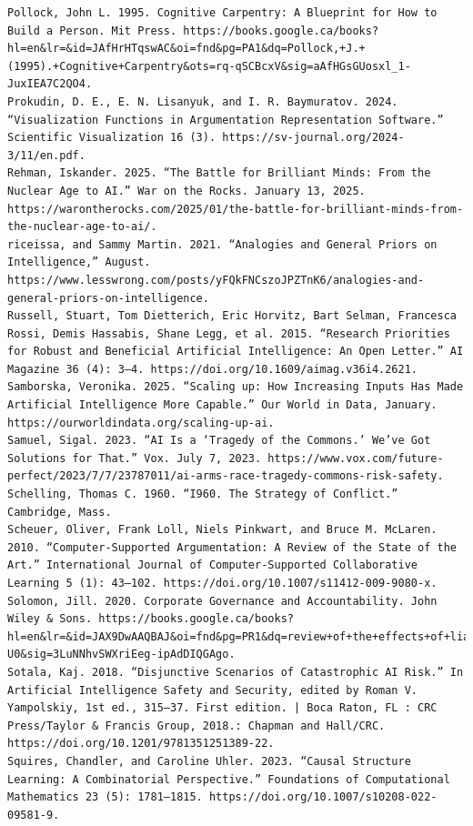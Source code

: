 \documentclass[
  11pt,
  letterpaper,
]{book}
\begin{document}
\begin{verbatim}
Pollock, John L. 1995. Cognitive Carpentry: A Blueprint for How to Build a Person. Mit Press. https://books.google.ca/books?hl=en&lr=&id=JAfHrHTqswAC&oi=fnd&pg=PA1&dq=Pollock,+J.+(1995).+Cognitive+Carpentry&ots=rq-qSCBcxV&sig=aAfHGsGUosxl_1-JuxIEA7C2QO4.
Prokudin, D. E., E. N. Lisanyuk, and I. R. Baymuratov. 2024. “Visualization Functions in Argumentation Representation Software.” Scientific Visualization 16 (3). https://sv-journal.org/2024-3/11/en.pdf.
Rehman, Iskander. 2025. “The Battle for Brilliant Minds: From the Nuclear Age to AI.” War on the Rocks. January 13, 2025. https://warontherocks.com/2025/01/the-battle-for-brilliant-minds-from-the-nuclear-age-to-ai/.
riceissa, and Sammy Martin. 2021. “Analogies and General Priors on Intelligence,” August. https://www.lesswrong.com/posts/yFQkFNCszoJPZTnK6/analogies-and-general-priors-on-intelligence.
Russell, Stuart, Tom Dietterich, Eric Horvitz, Bart Selman, Francesca Rossi, Demis Hassabis, Shane Legg, et al. 2015. “Research Priorities for Robust and Beneficial Artificial Intelligence: An Open Letter.” AI Magazine 36 (4): 3–4. https://doi.org/10.1609/aimag.v36i4.2621.
Samborska, Veronika. 2025. “Scaling up: How Increasing Inputs Has Made Artificial Intelligence More Capable.” Our World in Data, January. https://ourworldindata.org/scaling-up-ai.
Samuel, Sigal. 2023. “AI Is a ‘Tragedy of the Commons.’ We’ve Got Solutions for That.” Vox. July 7, 2023. https://www.vox.com/future-perfect/2023/7/7/23787011/ai-arms-race-tragedy-commons-risk-safety.
Schelling, Thomas C. 1960. “I960. The Strategy of Conflict.” Cambridge, Mass.
Scheuer, Oliver, Frank Loll, Niels Pinkwart, and Bruce M. McLaren. 2010. “Computer-Supported Argumentation: A Review of the State of the Art.” International Journal of Computer-Supported Collaborative Learning 5 (1): 43–102. https://doi.org/10.1007/s11412-009-9080-x.
Solomon, Jill. 2020. Corporate Governance and Accountability. John Wiley & Sons. https://books.google.ca/books?hl=en&lr=&id=JAX9DwAAQBAJ&oi=fnd&pg=PR1&dq=review+of+the+effects+of+liability+frameworks+on+corporate+governance+&ots=ny23_vd-U0&sig=3LuNNhvSWXriEeg-ipAdDIQGAgo.
Sotala, Kaj. 2018. “Disjunctive Scenarios of Catastrophic AI Risk.” In Artificial Intelligence Safety and Security, edited by Roman V. Yampolskiy, 1st ed., 315–37. First edition. | Boca Raton, FL : CRC Press/Taylor & Francis Group, 2018.: Chapman and Hall/CRC. https://doi.org/10.1201/9781351251389-22.
Squires, Chandler, and Caroline Uhler. 2023. “Causal Structure Learning: A Combinatorial Perspective.” Foundations of Computational Mathematics 23 (5): 1781–1815. https://doi.org/10.1007/s10208-022-09581-9.

\end{verbatim}
\end{document}
